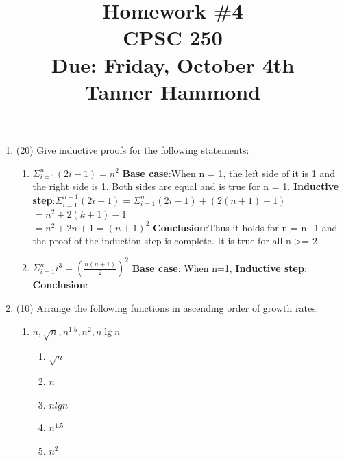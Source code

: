 \documentclass[12pt]{article}
\begin{document}

\title{Homework \#4 \\ CPSC 250 \\ Due: Friday, October 4th \\ Tanner Hammond}%
\date{}

\maketitle




\begin{enumerate}
\item (20) Give inductive proofs for the following statements:
\begin{enumerate}
\item $\Sigma_{i=1}^{n}(2i-1) = n^2$ \newline
\textbf{Base case}:When n = 1, the left side of it is 1 and the right side is 1. Both sides are equal and is true for n = 1. \newline
\textbf{Inductive step}:$\Sigma_{i = 1}^{n+1}(2i-1) = \Sigma_{i=1}^{n}(2i-1)+(2(n+1)-1)$\\
$=n^2 + 2(k+1)-1$\\
$=n^2 +2n + 1 = (n+1)^2$\newline
\textbf{Conclusion}:Thus it holds for n = n+1 and the proof of the induction step is complete. It is true for all n >= 2
\vspace{30px}
\item $\Sigma_{i=1}^{n}i^3 = (\frac{n(n+1)}{2})^2$\newline
\textbf{Base case}: When n=1, \newline
\textbf{Inductive step}:\newline
\textbf{Conclusion}:
\vspace{30px}
\end{enumerate}

\item (10) Arrange the following functions in ascending order of growth rates.
\begin{enumerate}
\item
$n, \sqrt{n}, n^{1.5}, n^2, n\lg n$
\begin{enumerate}
\item $\sqrt{n}$
\item $n$
\item $nlgn$
\item $n^1.5$
\item $n^2$
\end{enumerate}


\end{enumerate}
\end{enumerate}
\end{document}
